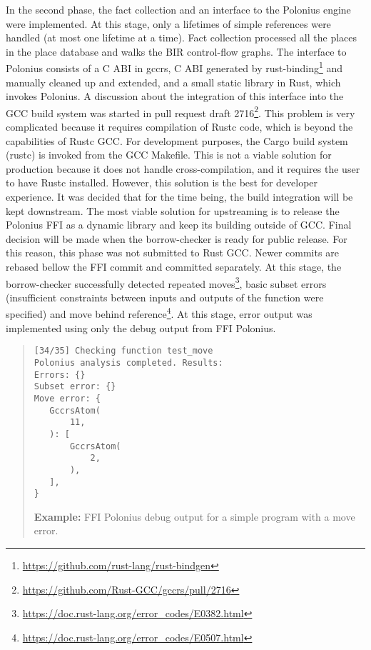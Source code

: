 \documentclass[
  11pt,
  twoside,symmetric]{report}
\DeclareRobustCommand{\href}[2]{#2\footnote{\url{#1}}}
\begin{document}
In the second phase, the fact collection and an interface to the
Polonius engine were implemented. At this stage, only a lifetimes of
simple references were handled (at most one lifetime at a time). Fact
collection processed all the places in the place database and walks the
BIR control-flow graphs. The interface to Polonius consists of a C ABI
in gccrs, C ABI generated by
\href{https://github.com/rust-lang/rust-bindgen}{rust-binding} and
manually cleaned up and extended, and a small static library in Rust,
which invokes Polonius. A discussion about the integration of this
interface into the GCC build system was started in
\href{https://github.com/Rust-GCC/gccrs/pull/2716}{pull request draft
2716}. This problem is very complicated because it requires compilation
of Rustc code, which is beyond the capabilities of Rustc GCC. For
development purposes, the Cargo build system (rustc) is invoked from the
GCC Makefile. This is not a viable solution for production because it
does not handle cross-compilation, and it requires the user to have
Rustc installed. However, this solution is the best for developer
experience. It was decided that for the time being, the build
integration will be kept downstream. The most viable solution for
upstreaming is to release the Polonius FFI as a dynamic library and keep
its building outside of GCC. Final decision will be made when the
borrow-checker is ready for public release. For this reason, this phase
was not submitted to Rust GCC. Newer commits are rebased bellow the FFI
commit and committed separately. At this stage, the borrow-checker
successfully detected
\href{https://doc.rust-lang.org/error_codes/E0382.html}{repeated moves},
basic subset errors (insufficient constraints between inputs and outputs
of the function were specified) and
\href{https://doc.rust-lang.org/error_codes/E0507.html}{move behind
reference}. At this stage, error output was implemented using only the
debug output from FFI Polonius.

\begin{quote}
\begin{verbatim}
[34/35] Checking function test_move
Polonius analysis completed. Results:
Errors: {}
Subset error: {}
Move error: {
   GccrsAtom(
       11,
   ): [
       GccrsAtom(
           2,
       ),
   ],
}
\end{verbatim}

\hfill\break
\textbf{Example:} FFI Polonius debug output for a simple program with a
move error.
\end{quote}
\end{document}
